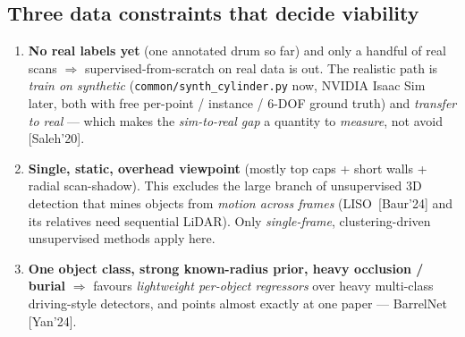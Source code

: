 \documentclass[10pt,a4paper]{article}
\begin{document}
\subsection{Three data constraints that decide viability}
\begin{enumerate}[leftmargin=1.6em,itemsep=2pt,topsep=2pt]
  \item \textbf{No real labels yet} (one annotated drum so far) and only a handful of real
  scans $\Rightarrow$ supervised-from-scratch on real data is out. The realistic path is
  \emph{train on synthetic} (\texttt{common/synth\_cylinder.py} now, NVIDIA Isaac Sim later,
  both with free per-point / instance / 6-DOF ground truth) and \emph{transfer to real} ---
  which makes the \emph{sim-to-real gap} a quantity to \emph{measure}, not avoid
  [Saleh'20].
  \item \textbf{Single, static, overhead viewpoint} (mostly top caps + short walls + radial
  scan-shadow). This excludes the large branch of unsupervised 3D detection that mines
  objects from \emph{motion across frames} (LISO~[Baur'24] and its relatives need sequential
  LiDAR). Only \emph{single-frame}, clustering-driven unsupervised methods apply here.
  \item \textbf{One object class, strong known-radius prior, heavy occlusion / burial}
  $\Rightarrow$ favours \emph{lightweight per-object regressors} over heavy multi-class
  driving-style detectors, and points almost exactly at one paper --- BarrelNet [Yan'24].
\end{enumerate}
\end{document}
